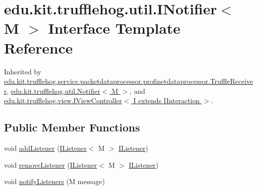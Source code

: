 \hypertarget{interfaceedu_1_1kit_1_1trufflehog_1_1util_1_1_i_notifier}{}\section{edu.\+kit.\+trufflehog.\+util.\+I\+Notifier$<$ M $>$ Interface Template Reference}
\label{interfaceedu_1_1kit_1_1trufflehog_1_1util_1_1_i_notifier}


Inherited by \hyperlink{classedu_1_1kit_1_1trufflehog_1_1service_1_1packetdataprocessor_1_1profinetdataprocessor_1_1_truffle_receiver}{edu.\+kit.\+trufflehog.\+service.\+packetdataprocessor.\+profinetdataprocessor.\+Truffle\+Receiver}, \hyperlink{classedu_1_1kit_1_1trufflehog_1_1util_1_1_notifier}{edu.\+kit.\+trufflehog.\+util.\+Notifier$<$ M $>$}, and \hyperlink{interfaceedu_1_1kit_1_1trufflehog_1_1view_1_1_i_view_controller}{edu.\+kit.\+trufflehog.\+view.\+I\+View\+Controller$<$ I extends I\+Interaction $>$}.

\subsection*{Public Member Functions}
\begin{DoxyCompactItemize}
\item 
void \hyperlink{interfaceedu_1_1kit_1_1trufflehog_1_1util_1_1_i_notifier_a5f823c4f68c848816503f09646ca08ba}{add\+Listener} (\hyperlink{interfaceedu_1_1kit_1_1trufflehog_1_1util_1_1_i_listener}{I\+Listener}$<$ M $>$ \hyperlink{interfaceedu_1_1kit_1_1trufflehog_1_1util_1_1_i_listener}{I\+Listener})
\item 
void \hyperlink{interfaceedu_1_1kit_1_1trufflehog_1_1util_1_1_i_notifier_a4c9e8f054b744e4e09b1d33fa11fbea1}{remove\+Listener} (\hyperlink{interfaceedu_1_1kit_1_1trufflehog_1_1util_1_1_i_listener}{I\+Listener}$<$ M $>$ \hyperlink{interfaceedu_1_1kit_1_1trufflehog_1_1util_1_1_i_listener}{I\+Listener})
\item 
void \hyperlink{interfaceedu_1_1kit_1_1trufflehog_1_1util_1_1_i_notifier_a8e9907d8ae194d5f59af215d61a7b3dc}{notify\+Listeners} (M message)
\end{DoxyCompactItemize}


